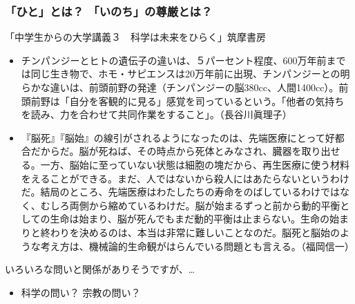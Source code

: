 \documentclass[10pt, dvipdfmx]{beamer}
\begin{document}
\begin{frame}
\frametitle{「ひと」とは？ 「いのち」の尊厳とは？}

\vspace*{-1ex}
\begin{block}{「中学生からの大学講義３　科学は未来をひらく」筑摩書房}
\begin{itemize}
\item チンパンジーとヒトの遺伝子の違いは、５パーセント程度、600万年前までは同じ生き物で、ホモ・サピエンスは20万年前に出現、チンパンジーとの明らかな違いは、前頭前野の発達（チンパンジーの脳380cc、人間1400cc）。前頭前野は「自分を客観的に見る」感覚を司っているという。「他者の気持ちを読み、力を合わせて共同作業をすること」。\hfill（長谷川眞理子）
\item 『脳死』『脳始』の線引がされるようになったのは、先端医療にとって好都合だからだ。脳が死ねば、その時点から死体とみなされ、臓器を取り出せる。一方、脳始に至っていない状態は細胞の塊だから、再生医療に使う材料をえることができる。まだ、人ではないから殺人にはあたらないというわけだ。結局のところ、先端医療はわたしたちの寿命をのばしているわけではなく、むしろ両側から縮めているわけだ。脳が始まるずっと前から動的平衡としての生命は始まり、脳が死んでもまだ動的平衡は止まらない。生命の始まりと終わりを決めるのは、本当は非常に難しいことなのだ。脳死と脳始のような考え方は、機械論的生命観がはらんでいる問題とも言える。（福岡信一）
\end{itemize}
\end{block}

\begin{alertblock}{いろいろな問いと関係がありそうですが、\ldots}
\begin{itemize}
\item 科学の問い？ 宗教の問い？
\end{itemize}
\end{alertblock}




\end{frame}
\end{document}
